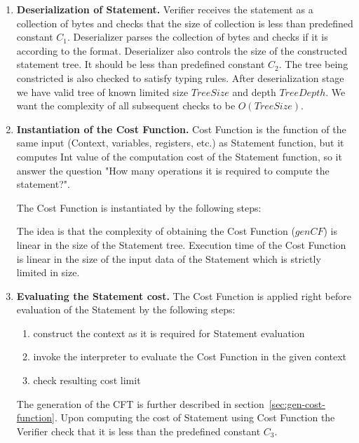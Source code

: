 \documentclass[11pt]{article}
\begin{document}
\begin{enumerate}
\item \textbf{Deserialization of Statement.}
Verifier receives the statement as a collection of bytes and checks that the
size of collection is less than predefined constant $C_1$. Deserializer parses
the collection of bytes and checks if it is according to the format.
Deserializer also controls the size of the constructed statement tree. It should
be less than predefined constant $C_2$. The tree being constricted is also
checked to satisfy typing rules. After deserialization stage we have valid tree
of known limited size $TreeSize$ and depth $TreeDepth$. We want the complexity
of all subsequent checks to be $O(TreeSize)$.

\item \textbf{Instantiation of the Cost Function.}
Cost Function is the function of the same input (Context, variables,
registers, etc.) as Statement function, but it computes Int value of the
computation cost of the Statement function, so it answer the question "How
many operations it is required to compute the statement?". 

The Cost Function is instantiated by the following steps:
    \begin{enumerate}
    \end{enumerate}

 The idea is that the complexity of obtaining the Cost Function ($genCF$) is
 linear in the size of the Statement tree. Execution time of the Cost Function
 is linear in the size of the input data of the Statement which is strictly
 limited in size.

\item \textbf{Evaluating the Statement cost.}
The Cost Function is applied right before evaluation of the Statement by the
following steps:
    \begin{enumerate}
        \item construct the context as it is required for Statement evaluation 
        \item invoke the interpreter to evaluate the Cost Function in the
        given context
        \item check resulting cost limit
    \end{enumerate}

The generation of the CFT is further described in
section~\ref{sec:gen-cost-function}. Upon computing the cost of Statement
using Cost Function the Verifier check that it is less than the predefined
constant $C_3$.
\end{enumerate}
\end{document}
